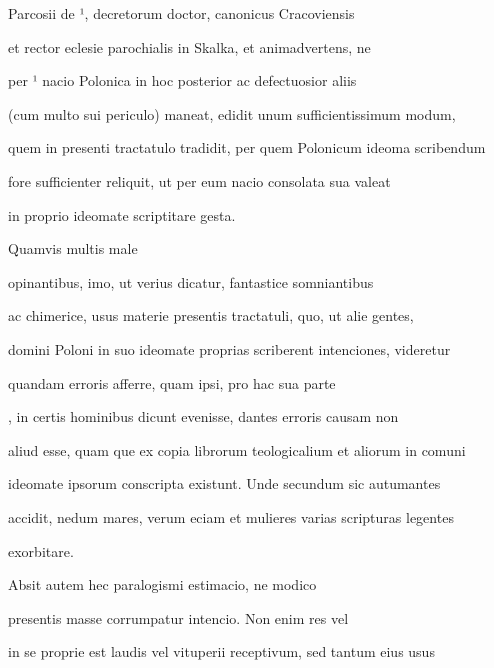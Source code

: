 \fulllines{}


\newpage
{}

Parcosii de ¹, decretorum doctor, canonicus Cracoviensis

et rector eclesie parochialis in Skalka, et animadvertens, ne 

 per ¹ nacio Polonica in hoc posterior ac defectuosior aliis

(cum multo sui periculo) maneat, edidit unum sufficientissimum modum,

quem in presenti tractatulo tradidit, per quem Polonicum ideoma scribendum

fore sufficienter reliquit, ut per eum nacio consolata sua valeat

\splitlines{}

in proprio ideomate scriptitare gesta.

\indentP Quamvis multis male

\fulllines{}

opinantibus, imo, ut verius dicatur, fantastice somniantibus

ac chimerice, usus materie presentis tractatuli, quo, ut alie gentes,

domini Poloni in suo ideomate proprias scriberent intenciones, videretur 

 quandam erroris afferre, quam ipsi, pro hac sua parte 

, in certis hominibus dicunt evenisse, dantes erroris causam non

aliud esse, quam que ex copia librorum teologicalium et aliorum in comuni

ideomate ipsorum conscripta existunt. Unde secundum sic autumantes

accidit, nedum mares, verum eciam et mulieres varias scripturas legentes

\splitlines{}

exorbitare.

\indentK Absit autem hec paralogismi estimacio, ne modico 

\fulllines{}

 presentis masse corrumpatur intencio. Non enim res vel 

 in se proprie est laudis vel vituperii receptivum, sed tantum eius usus

